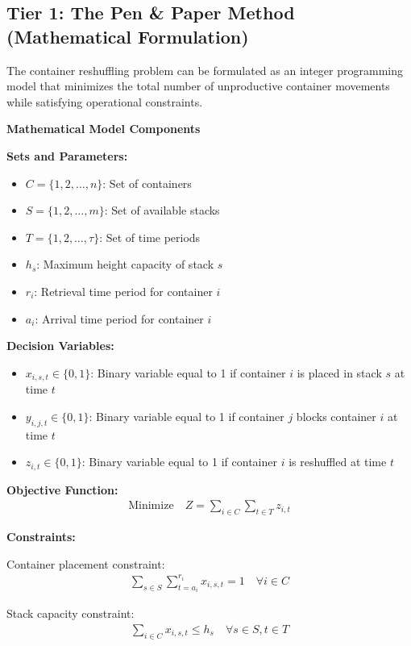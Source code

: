 \documentclass{article}
\begin{document}
\subsection{Tier 1: The Pen \& Paper Method (Mathematical Formulation)}

The container reshuffling problem can be formulated as an integer programming model that minimizes the total number of unproductive container movements while satisfying operational constraints.

\textbf{Mathematical Model Components}

\textbf{Sets and Parameters:}
\begin{itemize}
\item $C = \{1, 2, \ldots, n\}$: Set of containers
\item $S = \{1, 2, \ldots, m\}$: Set of available stacks
\item $T = \{1, 2, \ldots, \tau\}$: Set of time periods
\item $h_s$: Maximum height capacity of stack $s$
\item $r_i$: Retrieval time period for container $i$
\item $a_i$: Arrival time period for container $i$
\end{itemize}

\textbf{Decision Variables:}
\begin{itemize}
\item $x_{i,s,t} \in \{0,1\}$: Binary variable equal to 1 if container $i$ is placed in stack $s$ at time $t$
\item $y_{i,j,t} \in \{0,1\}$: Binary variable equal to 1 if container $j$ blocks container $i$ at time $t$
\item $z_{i,t} \in \{0,1\}$: Binary variable equal to 1 if container $i$ is reshuffled at time $t$
\end{itemize}

\textbf{Objective Function:}
\begin{align}
\text{Minimize} \quad Z = \sum_{i \in C} \sum_{t \in T} z_{i,t}
\end{align}

\textbf{Constraints:}

Container placement constraint:
\begin{align}
\sum_{s \in S} \sum_{t=a_i}^{r_i} x_{i,s,t} = 1 \quad \forall i \in C
\end{align}

Stack capacity constraint:
\begin{align}
\sum_{i \in C} x_{i,s,t} \leq h_s \quad \forall s \in S, t \in T
\end{align}
\end{document}
